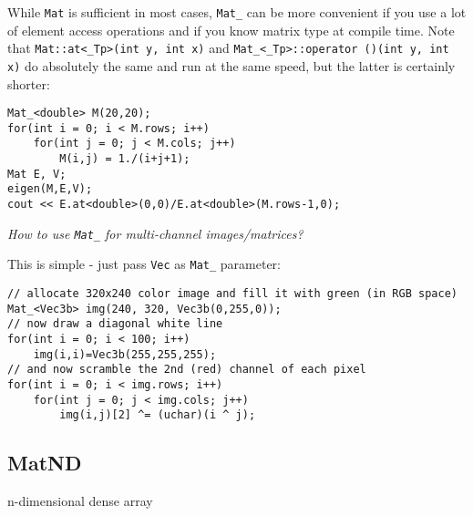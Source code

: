 While \texttt{Mat} is sufficient in most cases, \texttt{Mat\_} can be more convenient if you use a lot of element access operations and if you know matrix type at compile time. Note that \texttt{Mat::at<\_Tp>(int y, int x)} and \texttt{Mat\_<\_Tp>::operator ()(int y, int x)} do absolutely the same and run at the same speed, but the latter is certainly shorter:

\begin{lstlisting}
Mat_<double> M(20,20);
for(int i = 0; i < M.rows; i++)
    for(int j = 0; j < M.cols; j++)
        M(i,j) = 1./(i+j+1);
Mat E, V;
eigen(M,E,V);
cout << E.at<double>(0,0)/E.at<double>(M.rows-1,0);
\end{lstlisting}

\emph{How to use \texttt{Mat\_} for multi-channel images/matrices?}

This is simple - just pass \texttt{Vec} as \texttt{Mat\_} parameter:
\begin{lstlisting}
// allocate 320x240 color image and fill it with green (in RGB space)
Mat_<Vec3b> img(240, 320, Vec3b(0,255,0));
// now draw a diagonal white line
for(int i = 0; i < 100; i++)
    img(i,i)=Vec3b(255,255,255);
// and now scramble the 2nd (red) channel of each pixel
for(int i = 0; i < img.rows; i++)
    for(int j = 0; j < img.cols; j++)
        img(i,j)[2] ^= (uchar)(i ^ j);
\end{lstlisting}

\subsection{MatND}\label{MatND}
n-dimensional dense array

